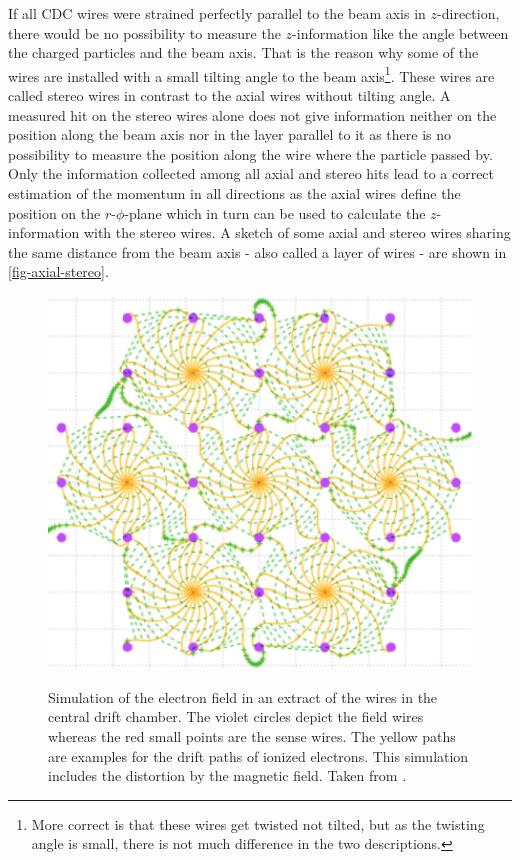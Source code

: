 If all CDC wires were strained perfectly parallel to the beam axis in $z$-direction, there would be no possibility to measure the $z$-information like the angle between the charged particles and the beam axis. That is the reason why some of the wires are installed with a small tilting angle to the beam axis\footnote{More correct is that these wires get twisted not tilted, but as the twisting angle is small, there is not much difference in the two descriptions.}. These wires are called stereo wires in contrast to the axial wires without tilting angle. A measured hit on the stereo wires alone does not give information neither on the position along the beam axis nor in the layer parallel to it as there is no possibility to measure the position along the wire where the particle passed by. Only the information collected among all axial and stereo hits lead to a correct estimation of the momentum in all directions as the axial wires define the position on the $r$-$\phi$-plane which in turn can be used to calculate the $z$-information with the stereo wires. A sketch of some axial and stereo wires sharing the same distance from the beam axis - also called a layer of wires - are shown in \ref{fig-axial-stereo}.

\begin{figure}
  \caption{Simulation of the electron field in an extract of the wires in the central drift chamber. The violet circles depict the field wires whereas the red small points are the sense wires. The yellow paths are examples for the drift paths of ionized electrons. This simulation includes the distortion by the magnetic field. Taken from \cite{cdc_design}.}
  \includegraphics[width=0.5\linewidth]{figures/experimental_setup/electronsInCDC.pdf}
  \label{fig-sense-wires}
\end{figure}


